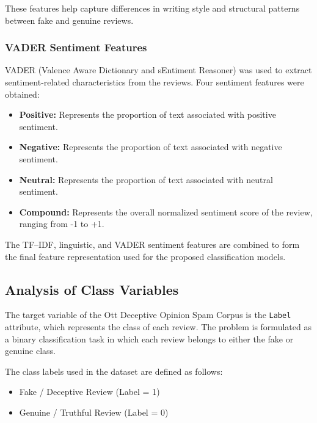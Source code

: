 \documentclass[12pt,a4paper]{report}
\begin{document}
These features help capture differences in writing style and structural patterns between fake and genuine reviews.

\subsubsection*{VADER Sentiment Features}

VADER (Valence Aware Dictionary and sEntiment Reasoner) was used to extract sentiment-related characteristics from the reviews. Four sentiment features were obtained:

\begin{itemize}
    \item \textbf{Positive:} Represents the proportion of text associated with positive sentiment.
    
    \item \textbf{Negative:} Represents the proportion of text associated with negative sentiment.
    
    \item \textbf{Neutral:} Represents the proportion of text associated with neutral sentiment.
    
    \item \textbf{Compound:} Represents the overall normalized sentiment score of the review, ranging from -1 to +1.
\end{itemize}

The TF--IDF, linguistic, and VADER sentiment features are combined to form the final feature representation used for the proposed classification models.

\subsection{Analysis of Class Variables}

The target variable of the Ott Deceptive Opinion Spam Corpus is the \texttt{Label} attribute, which represents the class of each review. The problem is formulated as a binary classification task in which each review belongs to either the fake or genuine class.

The class labels used in the dataset are defined as follows:

\begin{itemize}
    \item Fake / Deceptive Review (Label = 1)
    \item Genuine / Truthful Review (Label = 0)
\end{itemize}
\end{document}
